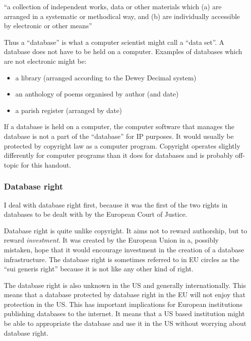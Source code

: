 ``a collection of independent works, data or other materials which (a)
are arranged in a systematic or methodical way, and (b) are individually
accessible by electronic or other means''

Thus a ``database'' is what a computer scientist might call a ``data
set''. A database does not have to be held on a computer. Examples of
databases which are not electronic might be:

\begin{itemize}
\item
  a library (arranged according to the Dewey Decimal system)
\item
  an anthology of poems organised by author (and date)
\item
  a parish register (arranged by date)
\end{itemize}

If a database is held on a computer, the computer software that manages
the database is not a part of the ``database'' for IP purposes. It would
usually be protected by copyright law as a computer program. Copyright
operates slightly differently for computer programs than it does for
databases and is probably off-topic for this handout.

\subsubsection{Database right}\label{database-right}

I deal with database right first, because it was the first of the two
rights in databases to be dealt with by the European Court of Justice.

Database right is quite unlike copyright. It aims not to reward
authorship, but to reward \emph{investment}. It was created by the
European Union in a, possibly mistaken, hope that it would encourage
investment in the creation of a database infrastructure. The database
right is sometimes referred to in EU circles as the ``sui generis
right'' because it is not like any other kind of right.

The database right is also unknown in the US and generally
internationally. This means that a database protected by database right
in the EU will not enjoy that protection in the US. This has important
implications for European institutions publishing databases to the
internet. It means that a US based institution might be able to
appropriate the database and use it in the US without worrying about
database right.

